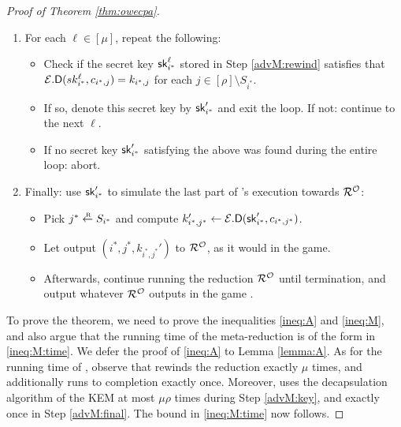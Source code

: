\begin{proof}[Proof of Theorem \ref{thm:owecpa}]
\begin{enumerate}[itemsep=0.1cm]
          until Step \ref{advA:brute} of \advA is reached.
          If while simulating \advA in this step, \advA aborts,
          simply continue by running \(\redR^{\oracle}\) to completion
          and output whatever \(\redR^{\oracle}\) outputs in the game \SICA.
    \item\label{advM:key} For each \(\ell \in [\mu]\), repeat the following:
          \begin{itemize}[label={\textbullet},itemsep=0.1cm]
            \item Check if the secret key \(\mathsf{sk}_{i^{*}}^{\ell}\)
                  stored in Step \ref{advM:rewind} satisfies that
                  \(\mathcal{E}.\mathsf{D}(sk_{i^{*}}^{\ell},c_{i^{*},j}) = k_{i^{*},j}\)
                  for each \(j \in [\rho] \setminus S_{i^{*}}\).
            \item If so, denote this secret key by \(\mathsf{sk}_{i^{*}}'\) and exit the loop.
                  If not: continue to the next \(\ell\).
            \item If no secret key \(\mathsf{sk}_{i^{*}}'\) satisfying the above
                  was found during the entire loop: abort.
          \end{itemize}
    \item\label{advM:final} Finally: use \(\mathsf{sk}_{i^{*}}'\) to simulate the last part of \advA's execution towards \(\redR^{\oracle}\):
          \begin{itemize}[label={\textbullet},itemsep=0.1cm]
                  \item Pick \(j^{*} \sampleR S_{i^{*}}\) and compute \(k_{i^{*},j^{*}}' \leftarrow \mathcal{E}.\mathsf{D}(\mathsf{sk}_{i^{*}}',c_{i^{*},j^{*}})\).
                  \item Let \advA output \((i^{*},j^{*}, k_{i^{*},j^{*}}')\) to \(\redR^{\oracle}\),
                  as it would in the \OWECPA game.
            \item Afterwards, continue running the reduction \(\redR^{\oracle}\)
                  until termination, and output whatever \(\redR^{\oracle}\)
                  outputs in the game \SICA.
          \end{itemize}
  \end{enumerate}

  To prove the theorem, we need to prove the inequalities \eqref{ineq:A} and \eqref{ineq:M},
  and also argue that the running time of the meta-reduction \redM is of the form in \eqref{ineq:M:time}.
  We defer the proof of \eqref{ineq:A} to Lemma \ref{lemma:A}.
  As for the running time of \redM,
  observe that \redM rewinds the reduction \redR exactly \(\mu\) times,
  and additionally runs \redR to completion exactly once.
  Moreover, \redM uses the decapsulation algorithm \Decaps of the KEM \KEM
  at most \(\mu \rho\) times during Step \ref{advM:key},
  and exactly once in Step \ref{advM:final}.
  The bound in \eqref{ineq:M:time} now follows.


\end{proof}
